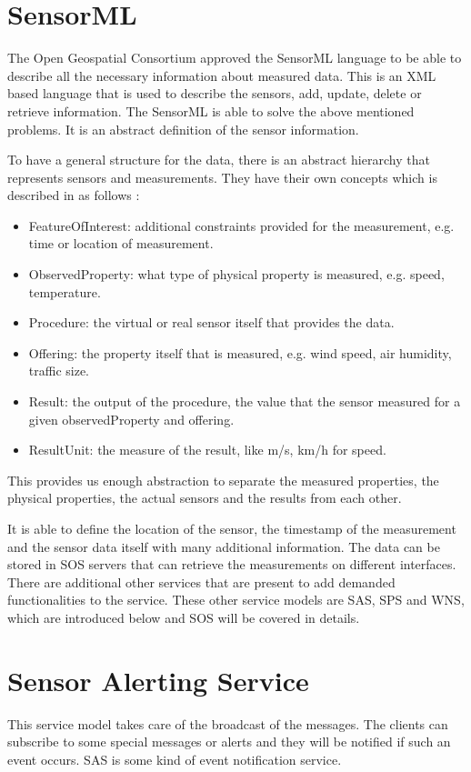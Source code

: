 \section{SensorML}

The Open Geospatial Consortium approved the SensorML language to be able to describe all the necessary information about measured data\cite{sensorml}. This is an XML based language that is used to describe the sensors, add, update, delete or retrieve information. The SensorML is able to solve the above mentioned problems. It is an abstract definition of the sensor information.

To have a general structure for the data, there is an abstract hierarchy that represents sensors and measurements. They have their own concepts which is described in as follows \cite{g2d2}:
\begin{itemize}
\item FeatureOfInterest: additional constraints provided for the measurement, e.g. time or location of measurement.
\item ObservedProperty: what type of physical property is measured, e.g. speed, temperature.
\item Procedure: the virtual or real sensor itself that provides the data.
\item Offering: the property itself that is measured, e.g. wind speed, air humidity, traffic size. 
\item Result: the output of the procedure, the value that the sensor measured for a given observedProperty and offering.
\item ResultUnit: the measure of the result, like m/s, km/h for speed.
\end{itemize}

This provides us enough abstraction to separate the measured properties, the physical properties, the actual sensors and the results from each other.

It is able to define the location of the sensor, the timestamp of the measurement and the sensor data itself with many additional information. The data can be stored in SOS servers that can retrieve the measurements on different interfaces. There are additional other services\cite{g4d3} that are present to add demanded functionalities to the service. These other service models are SAS, SPS and WNS, which are introduced below and SOS will be covered in details.

\section{Sensor Alerting Service}
This service model takes care of the broadcast of the messages. The clients can subscribe to some special messages or alerts and they will be notified if such an event occurs. SAS is some kind of event notification service.

